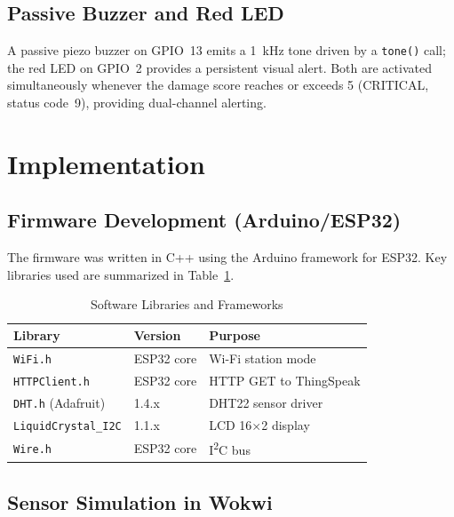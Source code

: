 \documentclass[12pt, a4paper]{article}
\begin{document}
\subsection{Passive Buzzer and Red LED}

A passive piezo buzzer on GPIO~13 emits a 1~kHz tone driven by a \texttt{tone()} call; the red LED on GPIO~2 provides a persistent visual alert. Both are activated simultaneously whenever the damage score reaches or exceeds 5 (CRITICAL, status code~9), providing dual-channel alerting.

\section{Implementation}
\label{sec:implementation}

\subsection{Firmware Development (Arduino/ESP32)}

The firmware was written in C++ using the Arduino framework for ESP32. Key libraries used are summarized in Table~\ref{tab:libs}.

\begin{table}[H]
\centering
\caption{Software Libraries and Frameworks}
\label{tab:libs}
\renewcommand{\arraystretch}{1.3}
\begin{tabular}{lll}
\toprule
\textbf{Library} & \textbf{Version} & \textbf{Purpose} \\
\midrule
\texttt{WiFi.h}              & ESP32 core & Wi-Fi station mode \\
\texttt{HTTPClient.h}        & ESP32 core & HTTP GET to ThingSpeak \\
\texttt{DHT.h} (Adafruit)    & 1.4.x      & DHT22 sensor driver \\
\texttt{LiquidCrystal\_I2C}  & 1.1.x      & LCD 16$\times$2 display \\
\texttt{Wire.h}              & ESP32 core & I\textsuperscript{2}C bus \\
\bottomrule
\end{tabular}
\end{table}

\subsection{Sensor Simulation in Wokwi}
\end{document}
